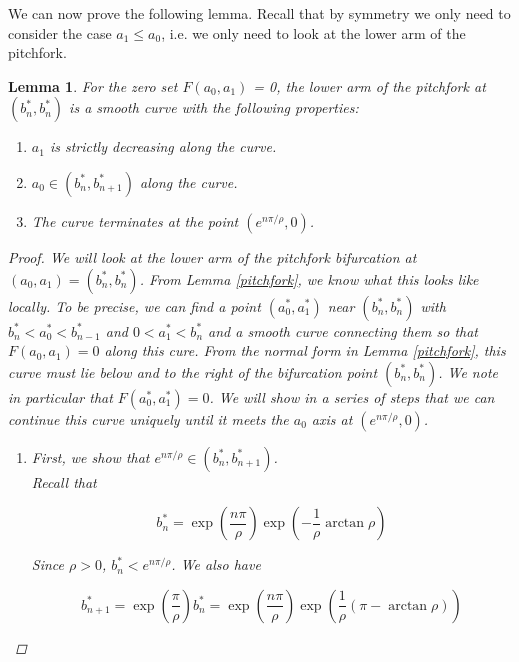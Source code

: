 \documentclass[12pt]{article}
\newtheorem{lemma}{Lemma}
\begin{document}
We can now prove the following lemma. Recall that by symmetry we only need to consider the case $a_1 \leq a_0$, i.e. we only need to look at the lower arm of the pitchfork.


\begin{lemma}\label{pitchcont}
For the zero set $F(a_0, a_1)$ = 0, the lower arm of the pitchfork at $(b_n^*, b_n^*)$ is a smooth curve with the following properties:

\begin{enumerate}
\item $a_1$ is strictly decreasing along the curve.
\item $a_0 \in (b_n^*, b_{n+1}^*)$ along the curve.
\item The curve terminates at the point $(e^{n \pi/\rho}, 0)$.
\end{enumerate}

\begin{proof}

We will look at the lower arm of the pitchfork bifurcation at $(a_0, a_1) = (b_n^*, b_n^*)$. From Lemma \ref{pitchfork}, we know what this looks like locally. To be precise, we can find a point $(a_0^*, a_1^*)$ near $(b_n^*, b_n^*)$ with $b_n^* < a_0^* < b_{n-1}^* $ and $0 < a_1^* < b_n^*$ and a smooth curve connecting them so that $F(a_0, a_1) = 0$ along this cure. From the normal form in Lemma \ref{pitchfork}, this curve must lie below and to the right of the bifurcation point $(b_n^*, b_n^*)$. We note in particular that $F(a_0^*, a_1^*) = 0$. We will show in a series of steps that we can continue this curve uniquely until it meets the $a_0$ axis at $(e^{n \pi/\rho}, 0)$.

\begin{enumerate}

\item First, we show that $e^{n \pi/\rho} \in (b^*_n, b^*_{n+1})$.\\

Recall that

\begin{equation*}
b^*_n = \exp\left(\frac{n \pi}{\rho} \right) \exp \left( -\frac{1}{\rho} \arctan \rho \right)
\end{equation*}

Since $\rho > 0$, $b^*_n < e^{n \pi/\rho}$. We also have 

\begin{equation*}
b^*_{n+1} = \exp\left(\frac{\pi}{\rho} \right) b^*_n = \exp\left(\frac{n \pi}{\rho} \right) \exp \left( \frac{1}{\rho}(\pi - \arctan \rho)\right)
\end{equation*}


\end{enumerate}
\end{proof}
\end{lemma}
\end{document}
